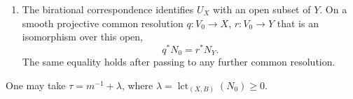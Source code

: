 \begin{proposition}
\begin{enumerate}
\begin{equation}
  N_Y=sS_Y,\qquad G_Y=S_Y,\qquad
  K_Y+S_Y\sim_{\mathbb Q}\tau sS_Y
\end{equation}
on a neighborhood of $S_Y$, and $S_Y|_{S_Y}\equiv0$.
\item The birational correspondence identifies $U_X$ with an open
subset of $Y$.  On a smooth projective common resolution
$q:V_0\to X$, $r:V_0\to Y$ that is an isomorphism over this open,
\begin{equation}\label{eq:isolation-pullbacks}
  q^*N_0=r^*N_Y.
\end{equation}
The same equality holds after passing to any further common resolution.
\end{enumerate}
One may take $\tau=m^{-1}+\lambda$, where
$\lambda=\operatorname{lct}_{(X,B)}(N_0)\geq0$.
\end{proposition}

